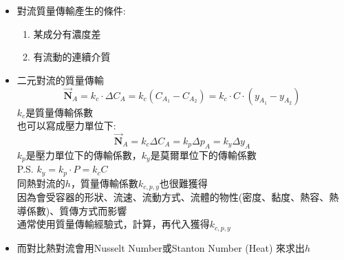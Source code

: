 \documentclass[../main.tex]{subfiles}
\begin{document}
\begin{itemize}
\begin{itemize}
    、Duforer effect$\vec{\bm q}^{(T)}$\\
    耗散項$\overline{\overline{\bm \tau}} : \left(\nabla \vec{\bm u}\right)$、
    變形項$P\bm \delta\bm\delta \cdot \vec{\bm u}$\\
    則微觀能量方程式變成:
    \begin{align}
      \vec {\bm e} &= -k\nabla T + \sum_{i=1}^N \hat H_i \vec{\bm J}_i + \sum_i (C_i \hat H_i) \vec{\bm u}\\
      \quad  &= -k\nabla T +\sum_{i=1}^N\left[
        \hat H_i \left(\vec{\bm J}_i + C_i \vec{\bm u}\right)
      \right] \nonumber\\
      &= \boxed{-k\nabla T + \sum_{i=1}^N \hat H_i \vec{\bm N}_i}
    \end{align}
    若沒有重力，穩態下的微觀能量平衡，就跟Equation of Continuity一樣
    \begin{equation}
      \boxed{\nabla \cdot \vec{\bm e} = 0}
    \end{equation}
    \item  對流質量傳輸產生的條件:
      \begin{enumerate}
        \item 某成分有濃度差
        \item 有流動的連續介質
      \end{enumerate}
    \item 二元對流的質量傳輸
      \begin{equation}
        \boxed{\vec{\bm N}_A = k_c\cdot \Delta C_A = k_c\left(C_{A_1}-C_{A_2}\right)=k_c\cdot C\cdot\left(y_{A_1}-y_{A_2}\right)}
      \end{equation}
      $k_c$是質量傳輸係數\\
      也可以寫成壓力單位下:
      \begin{equation}
        \boxed{\vec{\bm N}_A = k_c\Delta C_A = k_p\Delta p_A = k_y\Delta y_A}
      \end{equation}
      $k_p$是壓力單位下的傳輸係數，$k_y$是莫爾單位下的傳輸係數\\
      P.S. $k_y = k_p\cdot P = k_c C$\\
      同熱對流的$h$，質量傳輸係數$k_{c,p,y}$也很難獲得\\
      因為會受容器的形狀、流速、流動方式、流體的物性(密度、黏度、熱容、熱導係數)、質傳方式而影響\\
      通常使用質量傳輸經驗式，計算，再代入獲得$k_{c,p,y}$
    \item 而對比熱對流會用Nusselt Number或Stanton Number (Heat) 來求出$h$\\

\end{itemize}
\end{itemize}
\end{document}
